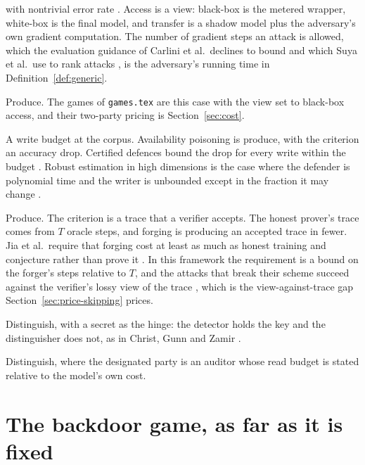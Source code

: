 \documentclass[11pt]{article}
\theoremstyle{definition}
\theoremstyle{plain}
\theoremstyle{remark}
\begin{document}
\begin{description}
        with nontrivial error rate \cite{GMFSRWG18}. Access is a view: black-box is the metered wrapper,
        white-box is the final model, and transfer is a shadow model plus the
        adversary's own gradient computation. The number of gradient steps an
        attack is allowed, which the evaluation guidance of Carlini et al.\ declines
        to bound \cite{CAPBRTGMK19} and which Suya et al.\ use to rank attacks
        \cite{SSZHTE24}, is the adversary's running time in
        Definition~\ref{def:generic}.
  \item[Extraction.] Produce. The games of \texttt{games.tex} are this case with
        the view set to black-box access, and their two-party pricing is
        Section~\ref{sec:cost}.
  \item[Poisoning.] A write budget at the corpus. Availability poisoning is
        produce, with the criterion an accuracy drop. Certified defences bound the
        drop for every write within the budget \cite{SKL17}. Robust estimation in
        high dimensions is the case where the defender is polynomial time and the
        writer is unbounded except in the fraction it may change
        \cite{DKKLMS16}.
  \item[Proof-of-learning.] Produce. The criterion is a trace that a verifier
        accepts. The honest prover's trace comes from $T$ oracle steps, and forging
        is producing an accepted trace in fewer. Jia et al.\ require that forging
        cost at least as much as honest training and conjecture rather than prove
        it \cite{JYCDTCP21}. In this framework the requirement is a bound on the
        forger's steps relative to $T$, and the attacks that break their scheme succeed against the
        verifier's lossy view of the trace \cite{FJTYCDCP23}, which is the
        view-against-trace gap Section~\ref{sec:price-skipping} prices.
  \item[Watermarking.] Distinguish, with a secret as the hinge: the detector holds
        the key and the distinguisher does not, as in Christ, Gunn and Zamir
        \cite{CGZ23}.
  \item[Filtering and auditing.] Distinguish, where the designated party is an
        auditor whose read budget is stated relative to the model's own cost.
\end{description}

\section{The backdoor game, as far as it is fixed}
\label{sec:backdoor}
\end{document}

